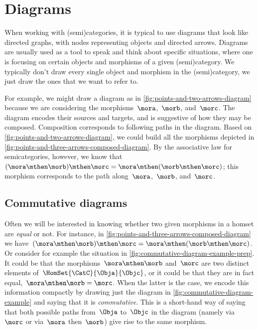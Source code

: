 
\section{Diagrams}

When working with (semi)categories, it is typical to use diagrams that look like directed graphs, with nodes representing objects and directed arrows.
Diagrams are usually used as a tool to speak and think about specific situations, where one is focusing on certain objects and morphisms of a given (semi)category.
We typically don't draw every single object and morphism in the (semi)category, we just draw the ones that we want to refer to.

\begin{marginfigure}
    \centering
    \caption{}
    \label{fig:points-and-three-arrows-diagram}
\end{marginfigure}

\begin{marginfigure}
    \centering
    \caption{}
    \label{fig:points-and-three-arrows-composed-diagram}
\end{marginfigure}

For example, we might draw a diagram as in \cref{fig:points-and-two-arrows-diagram} because we are considering the morphisms~$\mora$,~$\morb$, and~$\morc$.
The diagram encodes their sources and targets, and is suggestive of how they may be composed.
Composition corresponds to following paths in the diagram.
Based on \cref{fig:points-and-two-arrows-diagram}, we could build all the morphisms depicted in \cref{fig:points-and-three-arrows-composed-diagram}.
By the associative law for semicategories, however, we know that~$(\mora \mthen \morb) \mthen \morc = \mora \mthen (\morb \mthen \morc)$;
this morphism corresponds to the path along~$\mora$,~$\morb$, and~$\morc$.

\subsection{Commutative diagrams}

Often we will be interested in knowing whether two given morphisms in a homset are \emph{equal} or not.
For instance, in \cref{fig:points-and-three-arrows-composed-diagram} we have~$(\mora \mthen \morb) \mthen \morc = \mora \mthen (\morb \mthen \morc)$.
Or consider for example the situation in \cref{fig:commutative-diagram-example-prep}.
It could be that the morphisms~$\mora \mthen \morb$ and~$\morc$ are two distinct elements of~$\HomSet{\CatC}{\Obja}{\Objc}$, or it could be that they are in fact equal,~$\mora \mthen \morb = \morc$.
When the latter is the case, we encode this information compactly by drawing just the diagram in \cref{fig:commutative-diagram-example} and saying that it is \emph{commutative}.
This is a short-hand way of saying that both possible paths from~$\Obja$ to~$\Objc$ in the diagram (namely via~$\morc$ or via~$\mora$ then~$\morb$) give rise to the same morphism.

